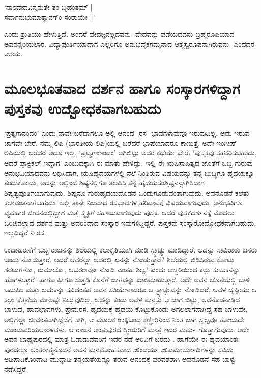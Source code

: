 \begin{shloka}
`ನಾಽವೇದವಿನ್ಮನುತೇ ತಂ ಬೃಹಂತಮ್ |\\
ಸರ್ವಾನುಭುಮಾತ್ಮಾನಗ್ಂ ಸಂರಾಯೇ ||'
\end{shloka}
ಎಂದು ಶ್ರುತಿಯು ಹೇಳುತ್ತಿದೆ. ಅಂದರೆ ವೇದಜ್ಞನಲ್ಲದವನು- ವೇದವನ್ನು ಪಡೆಯದವನು ಬ್ರಹ್ಮರೂಪಿಯಾದ ಅವನನ್ನರಿಯಲಾರ. ವಿದ್ಯಾಪೂರ್ತಿಯಾದಾಗ ಎಲ್ಲರಿಗೂ ಅನುಭವೈಕಗಮ್ಯನಾದ ಆತ್ಮಸ್ವರೂಪನಾಗಿರುವನು- ಎಂದದರ ಆಶಯ.

\section*{ಮೂಲಭೂತವಾದ ದರ್ಶನ ಹಾಗೂ ಸಂಸ್ಕಾರಗಳಿದ್ದಾಗ ಪುಸ್ತಕವು ಉದ್ಬೋಧಕವಾಗಬಹುದು}

`ಪ್ರತ್ಯಗಾನಂದಂ' ಎಂದು ನಾವೇ ಬರೆದಾಗಲೂ ಅಲ್ಲಿ ಆನಂದ- ರಸ- ಭಾವಗಳಾವುವೂ ಇರುವುದಿಲ್ಲ. ಅದು ಇರುವ ಜಾಗವೇ ಬೇರೆ. ನಮ್ಮ ಲಿಪಿ (ಭಾರತೀಯ ಲಿಪಿ)ಯಲ್ಲಿ ಬರೆದರೆ ಭಾಷೆಯಾದರೂ ಕಾಣುತ್ತೆ. ಅದೇ ಇಂಗೀಷ್ ಲಿಪಿಯಲ್ಲಿ ಬರೆದರೆ ಅದೂ ಇಲ್ಲ. `ಪ್ರಟ್ಯಗಾಣಂಡಂ' ಆಗಿಬಿಟ್ಟು  ಅದರ ಕಥೆಯೇ ಬೇರೆ. `ಪುಸ್ತಕವು ಸಹಕರಿಸಬಹುದು, ಆದರೆ ಪ್ರಾಕ್ಟಿಕಲ್ ಇದ್ದಾಗ' ಎಂಬುದಕ್ಕಾಗಿ ಈ ಮಾತು ಹೇಳಿದ್ದು. ಇಲ್ಲಿ ಈ ಋಷಿಸಾಹಿತ್ಯದ ಜೊತೆಗೆ ಒಬ್ಬ ಗುರುವು ಅನುಭವಿಯಾದವನು ಲಭಿಸಿದಾಗ, ಋಷಿಹೃದಯಗಳಲ್ಲಿ ನೆಲೆ ನಿಂತಿರುವ ವಿಷಯವನ್ನು ತನ್ನ ಬುದ್ಧಿಗೂ ಹೃದಯಕ್ಕೂ ತಂದುಕೊಂಡು, ಅದನ್ನು ಅಲ್ಲಿಂದ ಶಿಷ್ಯನಲ್ಲಿಗೂ ತಲಪಿಸಿ ತನ್ನ ಹೃದಯಸಂಶ್ಲಿಷ್ಟನನ್ನಾಗಿಸಿದಾಗ ಶಿಷ್ಯತ್ವಪೂರ್ತಿಯಾಗುವುದು. ಶಿಷ್ಯನೂ ಗುರುಹೃದಯದೊಡನೆ ಒಂದುಗೂಡುವಂತಾಗುವುದು. ಅವನೊಡನೆ ಕಲೆತು ಕಲಾವಂತನಾಗಬಹುದು. ಅಲ್ಲಿ ತಾನೇ ನಿಜವಾದ ರಸಭಾವಗಳ ಹರಿದಾಟಕ್ಕೆ ವಿಷಯವಾಗುವುದು. ಅನುಭವಿಗೂ ವ್ಯವಹಾರ ಜೀವನದಲ್ಲಿದ್ದಾಗ ಮತ್ತೆ ಸ್ಮೃತಿಗೆ ಸಹಾಯವಾಗುವುದು ಪುಸ್ತಕ. ಆದರೆ ಪುಸ್ತಕದರ್ಶನಕ್ಕೆ ಮೊದಲು ಒರಿಜಿನಲ್ಲಾದ ದರ್ಶನ ಮತ್ತು ಅದರಿಂದಾದ ಸಂಸ್ಕಾರ ಇವುಗಳಿದ್ದಿದ್ದರೆ, ಪುಸ್ತಕವು ಸಂಸ್ಕಾರೋದ್ಭೋಧಕವಾಗಬಹುದು. ಇಲ್ಲದಿದ್ದರೆ ನೀರಸ.

ಉದಾಹರಣೆಗೆ ಒಬ್ಬ ರಾಜನನ್ನು ಶಿಲೆಯಲ್ಲಿ ಕಲಾಕೃತಿಯಾಗಿ ಮಾಡಿ ಸ್ಟ್ಯಾಚ್ಯು ಮಾಡಿದ್ದಾರೆ. ಅದನ್ನು ಸಾವಿರಾರು ಜನರು ಬಂದು ನೋಡುತ್ತಾರೆ. ಆದರೆ ಅವರೆಲ್ಲಾ ಅದರಲ್ಲಿ ಏನನ್ನು ನೋಡುತ್ತಾರೆ? ಶಿಲೆಯಲ್ಲಿ ಬಿಡಿಸಿರುವ ಕೋಟು ಶರಟುಗಳೋ, ರುಮಾಲೋ, ಆಭರಣವೋ ನೋಡಿ ಎಂತಹ ಶಿಲ್ಪ? ಎಂದು ಅಚ್ಚರಿಯಿಂದ ಕಲ್ಲು ಕುಟುಕನನ್ನು ಹೊಗಳುತ್ತಾರೆ. ಹಾಗೂ ಹೀಗೂ ಸುತ್ತಡಿ ಕೊನೆಗೆ ಜಾಗವನ್ನು ಖಾಲಿಮಾಡುತ್ತಾರೆ. ಅದೇ ಅವನ ಜೊತೆಯಲ್ಲಿ ಬಾಳಿ ಬದುಕಿದ ಮತ್ತು ಬದುಕನ್ನು ಸವಿದಂತಹ ಅವನ ಸತಿಯೇನಾದರೂ ಆ ಸ್ಟ್ಯಾಚ್ಯುವನ್ನು ನೋಡಿದರೆ, ಅವಳ ದೃಷ್ಟಿಯು ಆ ಕಲ್ಲು ಕೆತ್ತನೆಯ ಮೇಲಷ್ಟೇ ನಿಲ್ಲುವುದಿಲ್ಲ. ಅದನ್ನು ಕಂಡು ಅವಳ ಮನಸ್ಸು ಆ ಜಾಗ ಬಿಟ್ಟು, ಅವನೊಡನಾಡಿದ ಬಾಳುವೆ, ಹಾವಭಾವಗಳು, ಪ್ರೇಮರಸ, ಹೃದಯಕ್ಕೆ ಹೃದಯ ಕೊಟ್ಟುಕೊಂಡು ಅಗಲಲಾಗದಾಗಿದ್ದ ಸಹ ಬಾಳುವೇ, ಅಲ್ಲಿಗೆಲ್ಲಾ ಜೀವಂತವಾಗಿದ್ದೆಡೆಗೆ ಸಾಗಿ, ಆ ಮೂಲಕ ಉಕ್ಕಿಬಂದ ಕಣ್ಣೀರಿನಿಂದ ನಿಂತ ಜಾಗ ಸ್ವಲ್ಪವೂ ತೋಯದೇ ಮುಂದುವರಿಯಲಾರಳವಳು. ಆ ರಾಜನ ಅಂತಃಪುರದ ಸ್ತ್ರೀಯರಿಗೆ ಮಾತ್ರ ಇದರ ಮರ್ಮ ಗೊತ್ತಾಗುವುದು. ಅದೇ ಅವನ ಬಾಹ್ಯಪುರದಲ್ಲಿ ಮಾತ್ರ ಓಡಾಡುವವರಿಗೆ ಇದರ ನಡೆ ಅರಿವಿಗೆ ಬರದು . ಹಾಗೆಯೇ ಈ ಹೃದಯಾಂತಃ ಪುರದಲ್ಲೂ ಅಂತರಾತ್ಮನೊಡನೆ ಅವನ ಮನಮೋಹಕವಾದ ಸೌಂದರ್ಯ ಸೌಕುಮಾರ್ಯಾದಿಗಳನ್ನು ಸವಿದು ಆಡಿಪಾಡಿಕೊಂಡಾಡಿ ಮುದ್ದಾಡಿ ತನ್ಮಯತೆಯನ್ನೂ ತರುವ ಆನಂದಕ್ಕೆ ಪರವಶರಾಗಿ ಅವನೊಡನೆ ಸಹ ಬಾಳ್ವೆ ನಡೆಸಿದ್ದರೆ-

